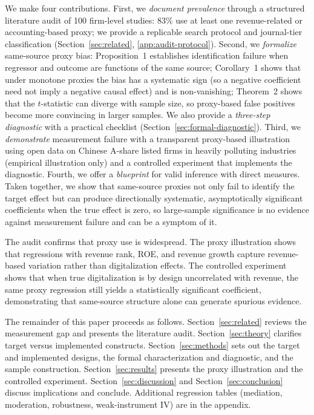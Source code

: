 We make four contributions. First, we \emph{document prevalence} through a structured literature audit of 100 firm-level studies: 83\% use at least one revenue-related or accounting-based proxy; we provide a replicable search protocol and journal-tier classification (Section~\ref{sec:related}, \ref{app:audit-protocol}). Second, we \emph{formalize} same-source proxy bias: Proposition~1 establishes identification failure when regressor and outcome are functions of the same source; Corollary~1 shows that under monotone proxies the bias has a systematic sign (so a negative coefficient need not imply a negative causal effect) and is non-vanishing; Theorem~2 shows that the $t$-statistic can diverge with sample size, so proxy-based false positives become more convincing in larger samples. We also provide a \emph{three-step diagnostic} with a practical checklist (Section~\ref{sec:formal-diagnostic}). Third, we \emph{demonstrate} measurement failure with a transparent proxy-based illustration using open data on Chinese A-share listed firms in heavily polluting industries (empirical illustration only) and a controlled experiment that implements the diagnostic. Fourth, we offer a \emph{blueprint} for valid inference with direct measures. Taken together, we show that same-source proxies not only fail to identify the target effect but can produce directionally systematic, asymptotically significant coefficients when the true effect is zero, so large-sample significance is no evidence against measurement failure and can be a symptom of it.

The audit confirms that proxy use is widespread. The proxy illustration shows that regressions with revenue rank, ROE, and revenue growth capture revenue-based variation rather than digitalization effects. The controlled experiment shows that when true digitalization is by design uncorrelated with revenue, the same proxy regression still yields a statistically significant coefficient, demonstrating that same-source structure alone can generate spurious evidence.

The remainder of this paper proceeds as follows. Section~\ref{sec:related} reviews the measurement gap and presents the literature audit. Section~\ref{sec:theory} clarifies target versus implemented constructs. Section~\ref{sec:methods} sets out the target and implemented designs, the formal characterization and diagnostic, and the sample construction. Section~\ref{sec:results} presents the proxy illustration and the controlled experiment. Section~\ref{sec:discussion} and Section~\ref{sec:conclusion} discuss implications and conclude. Additional regression tables (mediation, moderation, robustness, weak-instrument IV) are in the appendix.
